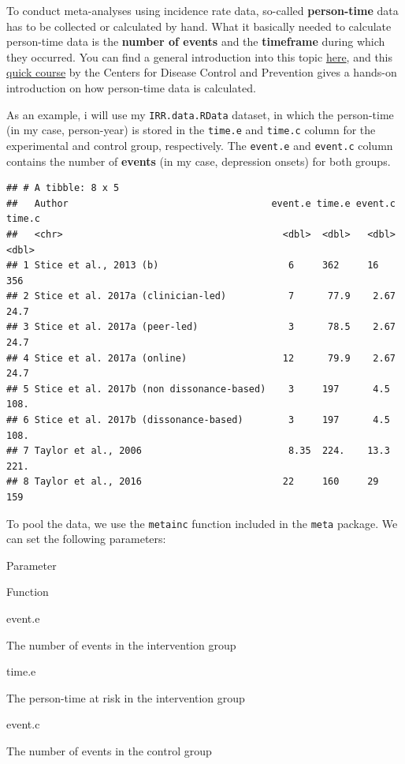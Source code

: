 \documentclass[]{book}
\begin{document}
To conduct meta-analyses using incidence rate data, so-called \textbf{person-time} data has to be collected or calculated by hand. What it basically needed to calculate person-time data is the \textbf{number of events} and the \textbf{timeframe} during which they occurred. You can find a general introduction into this topic \href{https://sph.unc.edu/files/2015/07/nciph_ERIC4.pdf}{here}, and this \href{https://www.cdc.gov/ophss/csels/dsepd/ss1978/lesson3/section2.html}{quick course} by the Centers for Disease Control and Prevention gives a hands-on introduction on how person-time data is calculated.

As an example, i will use my \texttt{IRR.data.RData} dataset, in which the person-time (in my case, person-year) is stored in the \texttt{time.e} and \texttt{time.c} column for the experimental and control group, respectively. The \texttt{event.e} and \texttt{event.c} column contains the number of \textbf{events} (in my case, depression onsets) for both groups.

\begin{verbatim}
## # A tibble: 8 x 5
##   Author                                    event.e time.e event.c time.c
##   <chr>                                       <dbl>  <dbl>   <dbl>  <dbl>
## 1 Stice et al., 2013 (b)                       6     362     16     356  
## 2 Stice et al. 2017a (clinician-led)           7      77.9    2.67   24.7
## 3 Stice et al. 2017a (peer-led)                3      78.5    2.67   24.7
## 4 Stice et al. 2017a (online)                 12      79.9    2.67   24.7
## 5 Stice et al. 2017b (non dissonance-based)    3     197      4.5   108. 
## 6 Stice et al. 2017b (dissonance-based)        3     197      4.5   108. 
## 7 Taylor et al., 2006                          8.35  224.    13.3   221. 
## 8 Taylor et al., 2016                         22     160     29     159
\end{verbatim}

To pool the data, we use the \texttt{metainc} function included in the \texttt{meta} package. We can set the following parameters:

Parameter

Function

event.e

The number of events in the intervention group

time.e

The person-time at risk in the intervention group

event.c

The number of events in the control group
\end{document}

